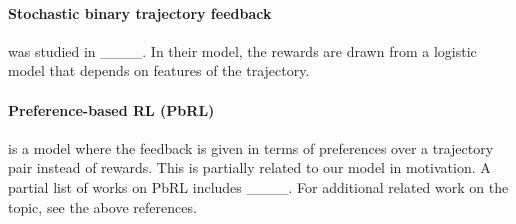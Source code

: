 \paragraph{\bf Stochastic binary trajectory feedback\hspace{-0.5em}} was studied in ____. In their model, the  rewards are drawn
from a logistic model that depends on features of the trajectory.


\paragraph{\bf Preference-based RL (PbRL)\hspace{-0.5em}} is a model where the feedback is given in terms of preferences over a trajectory pair instead of rewards. This is partially related to our model in motivation. A partial list of works on PbRL includes ____. For additional related work on the topic, see the above references.




\begingroup  %
\renewcommand{\thefootnote}{\fnsymbol{footnote}}  %


